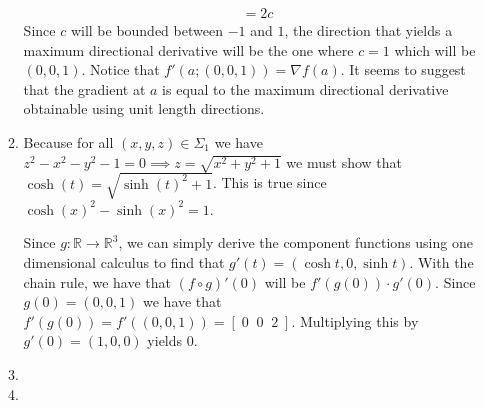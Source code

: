 \documentclass[letterpaper,10pt]{article}
\begin{document}
\begin{enumerate}
\begin{enumerate}
\begin{align*}
			 & = 2c
		\end{align*}
		Since $c$ will be bounded between $-1$ and $1$, the direction that yields a maximum directional derivative will be the one where $c = 1$ which will be $(0, 0, 1)$. Notice that $f'(a;(0,0,1)) = \nabla f(a)$. It seems to suggest that the gradient at $a$ is equal to the maximum directional derivative obtainable using unit length directions.
		\item Because for all $(x, y, z) \in \Sigma_1$ we have $z^2 - x^2 - y^2 - 1 = 0 \implies z = \sqrt{x^2 + y^2 + 1}$ we must show that $\cosh(t) = \sqrt{\sinh(t)^2 + 1}$. This is true since $\cosh(x)^2 - \sinh(x)^2 = 1$.

		Since $g : \mathbb{R} \to \mathbb{R}^3$, we can simply derive the component functions using one dimensional calculus to find that $g'(t) = (\cosh t, 0, \sinh t)$. With the chain rule, we have that $(f \circ g)'(0)$ will be $f'(g(0)) \cdot g'(0)$. Since $g(0) = (0,0,1)$ we have that $f'(g(0)) = f'((0,0,1)) = [\; 0 \;\; 0 \;\; 2 \;]$. Multiplying this by $g'(0) = (1,0,0)$ yields 0.

		
		\item 
		\item 
	\end{enumerate}


\end{enumerate}
\end{document}
